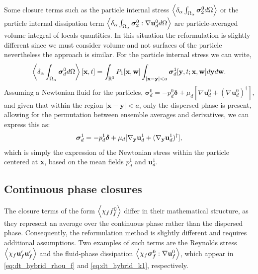 Some closure terms such as the particle internal stress $\left<\delta_\alpha \int_{\Omega_{\alpha}} \bm{\sigma}_2^0 d\Omega\right>$ or the particle internal dissipation term $\left<\delta_\alpha \int_{\Omega_{\alpha}} \bm{\sigma}_2^0:\mathbf{\nabla} \textbf{u}_d^0 d\Omega\right>$ are particle-averaged volume integral of locals quantities. 
In this situation the reformulation is slightly different since we must consider volume and not surfaces of the particle nevertheless the approach is similar. 
For the particle internal stress we can write, 
\begin{equation}
    \pOavg{\bm\sigma_d^0}[\textbf{x},t]
    =
    \int_{\mathbb{R}^3}
    P_1[\textbf{x},\textbf{w}]
    \int_{|\textbf{x}-\textbf{y}|<a}
    \bm\sigma_d^1[\textbf{y},t;\textbf{x},\textbf{w}] 
    d\textbf{y}
    d\textbf{w}. 
    \label{eq:conditionally_averaged_vol}
\end{equation}
Assuming a Newtonian fluid for the particles, $\bm\sigma_d^0 = -p_d^0 \bm\delta + \mu_d [\nabla \textbf{u}_d^0 + (\nabla \textbf{u}_d^0)^\dagger]$, and given that within the region $|\textbf{x} - \textbf{y}| < a$, only the dispersed phase is present, allowing for the permutation between ensemble averages and derivatives, we can express this as:
\begin{equation}
    \bm\sigma_d^1  
    = 
    -p_d^1   \bm\delta
    + \mu_d  [\pddy \textbf{u}^1_d+(\pddy  \textbf{u}^1_d)^\dagger],
    \label{eq:dispersed_phase_stress}
\end{equation}
which is simply the expression of the Newtonian stress within the particle centered at \textbf{x}, based on the mean fields $p_d^1$ and $\textbf{u}_d^1$. 


\subsection{Continuous phase closures}

The closure terms of the form $\left<\chi_f f_f^0\right>$ differ in their mathematical structure, as they represent an average over the continuous phase rather than the dispersed phase. 
Consequently, the reformulation method is slightly different and requires additional assumptions. Two examples of such terms are the Reynolds stress $\left<\chi_f \textbf{u}_f'\textbf{u}_f'\right>$ and the fluid-phase dissipation $\left<\chi_f \bm\sigma_f^0 : \nabla \textbf{u}_f^0\right>$, which appear in \ref{eq:dt_hybrid_rhou_f} and \ref{eq:dt_hybrid_k1}, respectively.  

